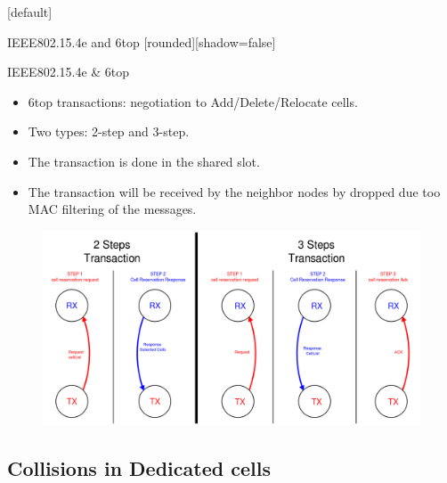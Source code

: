 \documentclass{beamer}
\makeatletter
\newenvironment{withoutheadline}{
        \setbeamertemplate{headline}[default]
        \def\beamer@entrycode{\vspace*{-\headheight}}
    }{}
\makeatother
\begin{document}
\begin{withoutheadline}
\begin{frame}{IEEE802.15.4e and 6top}
[rounded][shadow=false]




\begin{block}{IEEE802.15.4e \& 6top}
    \begin{itemize}
    \item 6top transactions: negotiation to Add/Delete/Relocate cells. 
    \item<2-> Two types: 2-step and 3-step.
    \item<3-> The transaction is done in the shared slot. 
    \item<4-> The transaction will be received by the neighbor nodes by dropped due too MAC filtering of the messages. 
    
    \end{itemize}
    \end{block}
    \centering
\begin{figure}[p]

\item<2-> \includegraphics[width=0.6\linewidth]{2,3steps.png}
\end{figure}

\end{frame}
\end{withoutheadline}





\subsection{Collisions in Dedicated cells}
\end{document}
